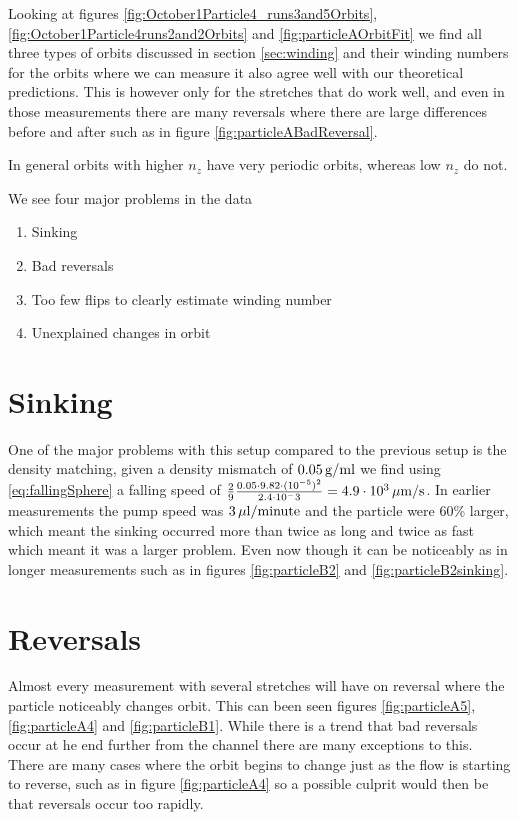 Looking at figures \ref{fig:October1Particle4_runs3and5Orbits}, \ref{fig:October1Particle4runs2and2Orbits} and \ref{fig:particleAOrbitFit} we find all three types of orbits discussed in section \ref{sec:winding} and their winding numbers for the orbits where we can measure it also agree well with our theoretical predictions. This is however only for the stretches that do work well, and even in those measurements there are many reversals where there are large differences before and after such as in figure \ref{fig:particleABadReversal}. 

In general orbits with higher $n_z$ have very periodic orbits, whereas low $n_z$ do not. 

We see four major problems in the data 

\begin{enumerate}
\item Sinking
\item Bad reversals
\item Too few flips to clearly estimate winding number
\item Unexplained changes in orbit
\end{enumerate}

\section{Sinking}
One of the major problems with this setup compared to the previous setup is the density matching, given a density mismatch of $\unit[0.05]{g/ml}$ we find using \ref{eq:fallingSphere} a falling speed of $\frac{2}{9} \frac{0.05 \cdot 9.82 \cdot (10^{-5})^2}{2.4\cdot 10^-3} = \unit[4.9\cdot10^3 ]{\mu m/s}$. In earlier measurements the pump speed was $\unit[3]{\mu l/minute}$ and the particle were 60\% larger, which meant the sinking occurred more than twice as long and twice as fast which meant it was a larger problem. Even now though it can be noticeably as in longer measurements such as in figures \ref{fig:particleB2} and \ref{fig:particleB2sinking}.

\section{Reversals}
Almost every measurement with several stretches will have on reversal where the particle noticeably changes orbit. This can been seen figures \ref{fig:particleA5}, \ref{fig:particleA4} and \ref{fig:particleB1}. While there is a trend that bad reversals occur at he end further from the channel there are many exceptions to this. There are many cases where the orbit begins to change just as the flow is starting to reverse, such as in figure \ref{fig:particleA4} so a possible culprit would then be that reversals occur too rapidly.



